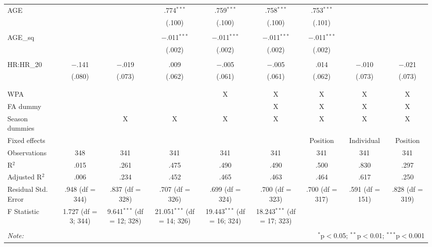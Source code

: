 \begin{table}[H]
\begin{tabular}{@{\extracolsep{5pt}}lcccccccc}
 AGE &  &  & .774$^{***}$ & .759$^{***}$ & .758$^{***}$ & .753$^{***}$ &  &  \\
  &  &  & (.100) & (.100) & (.100) & (.101) &  &  \\
  & & & & & & & & \\
 AGE\_sq &  &  & $-$.011$^{***}$ & $-$.011$^{***}$ & $-$.011$^{***}$ & $-$.011$^{***}$ &  &  \\
  &  &  & (.002) & (.002) & (.002) & (.002) &  &  \\
  & & & & & & & & \\
 HR:HR\_20 & $-$.141 & $-$.019 & .009 & $-$.005 & $-$.005 & .014 & $-$.010 & $-$.021 \\
  & (.080) & (.073) & (.062) & (.061) & (.061) & (.062) & (.073) & (.073) \\
  & & & & & & & & \\
\hline \\[-1.8ex]
WPA &  &  &  & X & X & X & X & X \\
FA dummy &  &  &  &  & X & X & X & X \\
Season dummies &  & X & X & X & X & X & X & X \\
Fixed effects &  &  &  &  &  & Position & Individual & Position \\
Observations & 348 & 341 & 341 & 341 & 341 & 341 & 341 & 341 \\
R$^{2}$ & .015 & .261 & .475 & .490 & .490 & .500 & .830 & .297 \\
Adjusted R$^{2}$ & .006 & .234 & .452 & .465 & .463 & .464 & .617 & .250 \\
Residual Std. Error & .948 (df = 344) & .837 (df = 328) & .707 (df = 326) & .699 (df = 324) & .700 (df = 323) & .700 (df = 317) & .591 (df = 151) & .828 (df = 319) \\
F Statistic & 1.727 (df = 3; 344) & 9.641$^{***}$ (df = 12; 328) & 21.051$^{***}$ (df = 14; 326) & 19.443$^{***}$ (df = 16; 324) & 18.243$^{***}$ (df = 17; 323) &  &  &  \\
\hline
\hline \\[-1.8ex]
\textit{Note:}  & \multicolumn{8}{r}{$^{*}$p$<$0.05; $^{**}$p$<$0.01; $^{***}$p$<$0.001} \\
\end{tabular}
\end{table}
